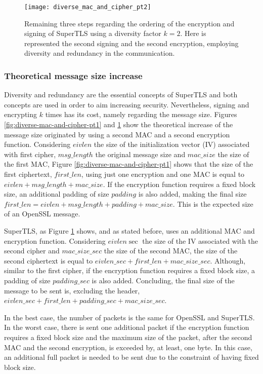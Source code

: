 \documentclass{sig-alternate-05-2015}
\begin{document}
\begin{figure}[t]
\texttt{[image: diverse\_mac\_and\_cipher\_pt2]}
\centering
\caption{Remaining three steps regarding the ordering of the encryption and signing of SuperTLS using a diversity factor $k = 2$. Here is represented the second signing and the second encryption, employing diversity and redundancy in the communication.}
\label{fig:diverse-mac-and-cipher-pt2}
\end{figure}

\subsubsection{Theoretical message size increase}

Diversity and redundancy are the essential concepts of SuperTLS and both concepts are used in order to aim increasing security. Nevertheless, signing and encrypting $k$ times has its cost, namely regarding the message size.
Figures \ref{fig:diverse-mac-and-cipher-pt1} and \ref{fig:diverse-mac-and-cipher-pt2} show the theoretical increase of the message size originated by using a second MAC and a second encryption function. Considering $eivlen$ the size of the initialization vector (IV) associated with first cipher, $msg\_length$ the original message size and $mac\_size$ the size of the first MAC, Figure \ref{fig:diverse-mac-and-cipher-pt1} shows that the size of the first ciphertext, $first\_len$, using just one encryption and one MAC is equal to $eivlen+msg\_length+mac\_size$. If the encryption function requires a fixed block size, an additional padding of size $padding$ is also added, making the final size $first\_len=eivlen+msg\_length+padding+mac\_size$. This is the expected size of an OpenSSL message.

SuperTLS, as Figure \ref{fig:diverse-mac-and-cipher-pt2} shows, and as stated before, uses an additional MAC and encryption function. Considering $eivlen\sec$ the size of the IV associated with the second cipher and $mac\_size\_sec$ the size of the second MAC, the size of the second ciphertext is equal to $eivlen\_sec+first\_len+mac\_size\_sec$. Although, similar to the first cipher, if the encryption function requires a fixed block size, a padding of size $padding\_sec$ is also added. Concluding, the final size of the message to be sent is, excluding the header, $eivlen\_sec+first\_len+padding\_sec+mac\_size\_sec$.

In the best case, the number of packets is the same for OpenSSL and SuperTLS. In the worst case, there is sent one additional packet if the encryption function requires a fixed block size and the maximum size of the packet, after the second MAC and the second encryption, is exceeded by, at least, one byte. In this case, an additional full packet is needed to be sent due to the constraint of having fixed block size.
\end{document}
